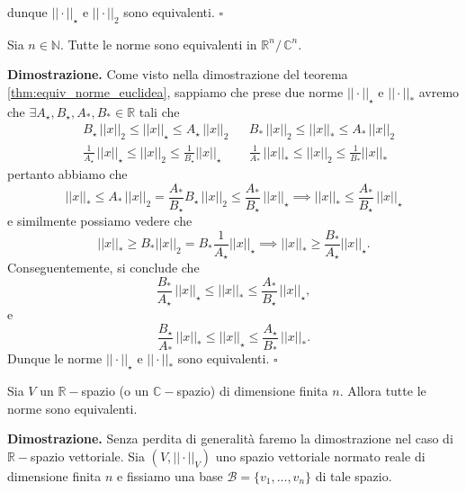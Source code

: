     dunque $||\cdot||_{\star}$ e $||\cdot||_2$ sono equivalenti.
\hfill $\square$
%
\vspace{0.5cm}
\begin{cor}
    Sia $n \in \mathbb{N}$. Tutte le norme sono equivalenti in $\mathbb{R}^n / \, \mathbb{C}^n$.
\end{cor}
%
\noindent \textbf{Dimostrazione. }
    Come visto nella dimostrazione del teorema \ref{thm:equiv_norme_euclidea}, sappiamo che prese due norme $||\cdot||_{\star}$ e $||\cdot||_{\ast}$ avremo che $\exists A_{\star}, B_{\star}, A_{\ast}, B_{\ast} \in \mathbb{R}$ tali che
    \[\begin{aligned}
        &B_{\star} \, ||x||_2 \leq ||x||_{\star} \leq A_{\star} \, ||x||_2 & &B_{\ast} \, ||x||_2 \leq ||x||_{\ast} \leq A_{\ast} \, ||x||_2 \\
        &\frac{1}{A_{\star}} \, ||x||_{\star} \leq ||x||_{2} \leq \frac{1}{B_{\star}} ||x||_{\star} & &\frac{1}{A_{\ast}} \, ||x||_{\ast} \leq ||x||_{2} \leq \frac{1}{B_{\ast}} ||x||_{\ast}
    \end{aligned}\]
    pertanto abbiamo che
    \[
    ||x||_{\ast} \leq  A_{\ast} \, ||x||_2 = \frac{A_{\ast}}{B_{\star}} B_{\star} \, ||x||_2 \leq \frac{A_{\ast}}{B_{\star}} \, ||x||_{\star} \implies ||x||_{\ast} \leq \frac{A_{\ast}}{B_{\star}} \, ||x||_{\star}
    \]
    e similmente possiamo vedere che
    \[
    ||x||_{\ast} \geq B_{\ast} ||x||_2 = B_{\ast} \frac{1}{A_{\star}} ||x||_{\star} \implies ||x||_{\ast} \geq \frac{B_{\ast}}{A_{\star}} ||x||_{\star}.
    \]
    Conseguentemente, si conclude che
    \[
    \frac{B_{\ast}}{A_{\star}} \, ||x||_{\star} \leq ||x||_{\ast} \leq \frac{A_{\ast}}{B_{\star}} \, ||x||_{\star},
    \]
    e
    \[
    \frac{B_{\star}}{A_{\ast}} \, ||x||_{\ast} \leq ||x||_{\star} \leq \frac{A_{\star}}{B_{\ast}} \, ||x||_{\ast}.
    \]
    Dunque le norme $||\cdot||_{\star}$ e $||\cdot||_{\ast}$ sono equivalenti.
\hfill $\square$
%
\vspace{0.5cm}
\begin{cor}[\textcolor{blue}{tutte le norme sono equivalenti su spazi di dimensione finita}]
    Sia $V$ un $\mathbb{R}-$spazio (o un $\mathbb{C}-$spazio) di dimensione finita $n$. Allora tutte le norme sono equivalenti. 
    \label{cor:equivalence_norms}
\end{cor}
%
\noindent \textbf{Dimostrazione. }
    Senza perdita di generalità faremo la dimostrazione nel caso di $\mathbb{R}-$spazio vettoriale. Sia $(V, ||\cdot||_V)$ uno spazio vettoriale normato reale di dimensione finita $n$ e fissiamo una base $\mathcal{B} = \{ v_1, \ldots, v_n \}$ di tale spazio.
